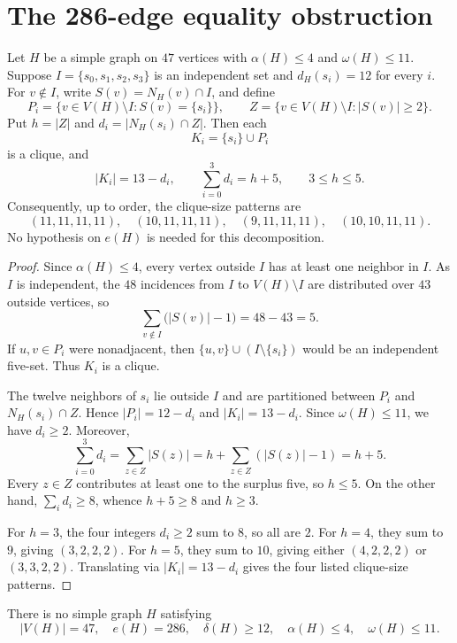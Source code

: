 \section{The 286-edge equality obstruction}
\label{sec:equality}

\begin{lemma}
\label{lem:private-neighbor-decomposition-e286}
Let $H$ be a simple graph on $47$ vertices with
$\alpha(H)\leq4$ and $\omega(H)\leq11$. Suppose
$I=\{s_0,s_1,s_2,s_3\}$ is an independent set and
$d_H(s_i)=12$ for every $i$. For $v\notin I$, write
$S(v)=N_H(v)\cap I$, and define
\[
P_i=\{v\in V(H)\setminus I:S(v)=\{s_i\}\},\qquad
Z=\{v\in V(H)\setminus I:|S(v)|\geq2\}.
\]
Put $h=|Z|$ and $d_i=|N_H(s_i)\cap Z|$. Then each
\[
K_i=\{s_i\}\cup P_i
\]
is a clique, and
\[
|K_i|=13-d_i,\qquad
\sum_{i=0}^3d_i=h+5,\qquad 3\leq h\leq5.
\]
Consequently, up to order, the clique-size patterns are
\[
(11,11,11,11),\quad (10,11,11,11),\quad
(9,11,11,11),\quad (10,10,11,11).
\]
No hypothesis on $e(H)$ is needed for this decomposition.
\end{lemma}

\begin{proof}
Since $\alpha(H)\leq4$, every vertex outside $I$ has at least one
neighbor in $I$. As $I$ is independent, the $48$ incidences from $I$
to $V(H)\setminus I$ are distributed over $43$ outside vertices, so
\[
\sum_{v\notin I}\bigl(|S(v)|-1\bigr)=48-43=5.
\]
If $u,v\in P_i$ were nonadjacent, then
$\{u,v\}\cup(I\setminus\{s_i\})$ would be an independent five-set.
Thus $K_i$ is a clique.

The twelve neighbors of $s_i$ lie outside $I$ and are partitioned
between $P_i$ and $N_H(s_i)\cap Z$. Hence
$|P_i|=12-d_i$ and $|K_i|=13-d_i$. Since $\omega(H)\leq11$,
we have $d_i\geq2$. Moreover,
\[
\sum_{i=0}^3d_i
=\sum_{z\in Z}|S(z)|
=h+\sum_{z\in Z}(|S(z)|-1)
=h+5.
\]
Every $z\in Z$ contributes at least one to the surplus five, so
$h\leq5$. On the other hand, $\sum_i d_i\geq8$, whence
$h+5\geq8$ and $h\geq3$.

For $h=3$, the four integers $d_i\geq2$ sum to $8$, so all are $2$.
For $h=4$, they sum to $9$, giving $(3,2,2,2)$.
For $h=5$, they sum to $10$, giving either $(4,2,2,2)$ or
$(3,3,2,2)$. Translating via $|K_i|=13-d_i$ gives the four
listed clique-size patterns.
\end{proof}

\begin{theorem}
\label{thm:E286}
There is no simple graph $H$ satisfying
\[
|V(H)|=47,\quad e(H)=286,\quad
\delta(H)\geq12,\quad\alpha(H)\leq4,\quad\omega(H)\leq11.
\]
\end{theorem}


